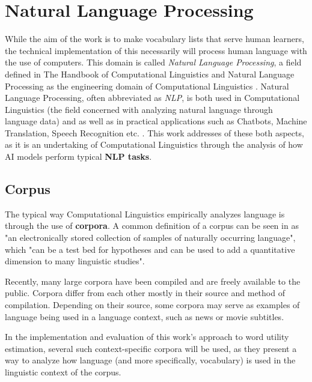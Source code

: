 \section{Natural Language Processing} \label{sec:natural-language-processing}
While the aim of the work is to make vocabulary lists that serve human learners, the technical implementation of this necessarily will process human language with the use of computers.
This domain is called \textit{Natural Language Processing}, a field defined in The Handbook of Computational Linguistics and Natural Language Processing as the engineering domain of Computational Linguistics \cite{alexanderclarkHandbookComputationalLinguistics2010}.
Natural Language Processing, often abbreviated as \textit{NLP}, is both used in Computational Linguistics (the field concerned with analyzing natural language through language data) and as well as in practical applications such as Chatbots, Machine Translation, Speech Recognition etc. \cite{jurafskySpeechLanguageProcessing2025}.
This work addresses of these both aspects, as it is an undertaking of Computational Linguistics through the analysis of how AI models perform typical \textbf{NLP tasks}.

\subsection{Corpus}
The typical way Computational Linguistics empirically analyzes language is through the use of \textbf{corpora}.
A common definition of a corpus can be seen in \cite{hunstonCorpusLinguistics2006a} as "an electronically stored collection of samples of naturally occurring language", which "can be a test bed for hypotheses and can be used to add a quantitative dimension to many linguistic studies".

Recently, many large corpora have been compiled and are freely available to the public.
Corpora differ from each other mostly in their source and method of compilation.
Depending on their source, some corpora may serve as examples of language being used in a language context, such as news or movie subtitles.

In the implementation and evaluation of this work's approach to word utility estimation, several such context-specific corpora will be used, as they present a way to analyze how language (and more specifically, vocabulary) is used in the linguistic context of the corpus.

